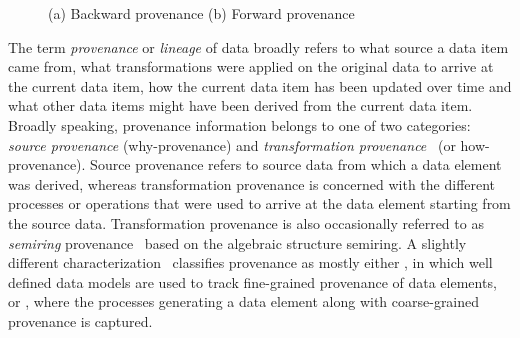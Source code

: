 
\begin{figure}
  \centering
  \label{diag}

  \caption{(a) Backward provenance (b) Forward provenance}

\end{figure}

The term \textit{provenance} or \textit{lineage} of data broadly refers to what source a data item came from, what transformations were applied on the original data to arrive at the current data item, how the current data item has been updated over time and what other data items might have been derived from the current data item. Broadly speaking, provenance information belongs to one of two categories: \textit{source provenance} (why-provenance) and \textit{transformation provenance}~\cite{tan_ieee04} (or how-provenance). Source provenance refers to source data from which a data element was derived, whereas transformation provenance is concerned with the different processes or operations that were used to arrive at the data element starting from the source data. Transformation provenance is also occasionally referred to as \textit{semiring} provenance~\cite{semirings_pods07} based on the algebraic structure semiring. A slightly different characterization~\cite{ikeda2010panda} classifies provenance as mostly either , in which well defined data models are used to track fine-grained provenance of data elements, or , where the processes generating a data element along with coarse-grained provenance is captured. 

